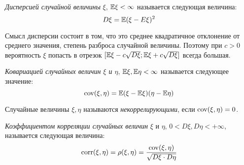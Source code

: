 \begin{definition}
	\textit{Дисперсией случайной величины} $\xi$, $\mathbb{E}\xi < \infty$ называется следующая величина:
	\[
		D\xi = \mathbb{E}(\xi - E\xi)^2
	\]
\end{definition}

\begin{note}
	Смысл дисперсии состоит в том, что это среднее квадратичное отклонение от среднего значения, степень разброса случайной величины. Поэтому при $c > 0$ вероятность $\xi$ попасть в отрезок $[\mathbb{E}\xi - c\sqrt{D\xi}; \mathbb{E}\xi + c\sqrt{D\xi}]$ всегда большая.
\end{note}

\begin{definition}
	\textit{Ковариацией случайных величин $\xi$ и $\eta$}, $\mathbb{E}\xi, \mathbb{E}\eta < \infty$ называется следующее значение:
	\[
		\operatorname{cov}(\xi, \eta) = \mathbb{E}(\xi - \mathbb{E}\xi)(\eta - \mathbb{E}\eta)
	\]
\end{definition}

\begin{definition}
	Случайные величины $\xi, \eta$ называются \textit{некоррелирующими}, если $\operatorname{cov}(\xi, \eta) = 0$.
\end{definition}

\begin{definition}
	\textit{Коэффициентом корреляции случайных величин} $\xi$ и $\eta$, $0 < D\xi, D\eta < +\infty$, называется следующая величина:
	\[
		\operatorname{corr}(\xi, \eta) = \rho(\xi, \eta) = \frac{\operatorname{cov}(\xi, \eta)}{\sqrt{D\xi \cdot D\eta}}
	\]
\end{definition}